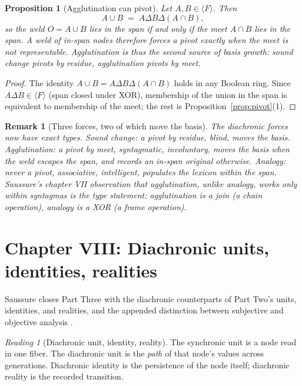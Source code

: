\documentclass[11pt,a4paper]{article}
\newtheorem{proposition}[principle]{Proposition}
\newtheorem{remark}[principle]{Remark}
\theoremstyle{remark}
\newtheorem{reading}[principle]{Reading}
\newcommand{\xor}{\ensuremath{\Delta}}                   %
\newcommand{\spanof}[1]{\ensuremath{\langle #1\rangle}}  %
\begin{document}
\begin{proposition}[Agglutination can pivot]
\label{prop:agglutination}
Let $A, B \in \spanof{F}$. Then
\[
  A \cup B \;=\; A \xor B \xor (A \cap B),
\]
so the weld $O = A \cup B$ lies in the span if and only if the meet
$A \cap B$ lies in the span. A weld of in-span nodes therefore \emph{forces a
pivot exactly when the meet is not representable}. Agglutination is thus the
second source of basis growth: sound change pivots by residue, agglutination
pivots by meet.
\end{proposition}

\begin{proof}
The identity $A \cup B = A \xor B \xor (A \cap B)$ holds in any Boolean ring.
Since $A \xor B \in \spanof{F}$ (span closed under XOR), membership of the
union in the span is equivalent to membership of the meet; the rest is
Proposition~\ref{prop:pivot}(1).
\end{proof}

\begin{remark}[Three forces, two of which move the basis]
The diachronic forces now have exact types. Sound change: a pivot by
residue, blind, moves the basis. Agglutination: a pivot by meet, syntagmatic,
involuntary, moves the basis when the weld escapes the span, and records an
in-span original otherwise. Analogy: never a pivot, associative, intelligent,
populates the lexicon within the span. Saussure's chapter VII observation
that agglutination, unlike analogy, works only within syntagmas is the type
statement: agglutination is a join (a chain operation), analogy is a XOR (a
frame operation).
\end{remark}

\section{Chapter VIII: Diachronic units, identities, realities}
\label{sec:ch8}

Saussure closes Part Three with the diachronic counterparts of Part Two's
units, identities, and realities, and the appended distinction between
subjective and objective analysis \cite[Part III, ch.~VIII]{harris1983}.

\begin{reading}[Diachronic unit, identity, reality]
\label{read:dia-unit}
The synchronic unit is a node read in one fiber. The diachronic unit is the
\emph{path} of that node's values across generations. Diachronic identity is
the persistence of the node itself; diachronic reality is the recorded
transition.
\end{reading}
\end{document}
